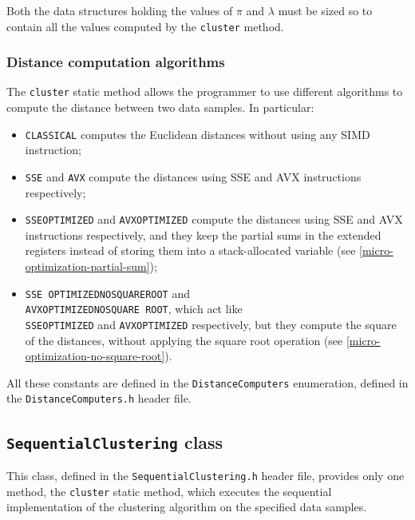 \documentclass{article}
\begin{document}
Both the data structures holding the values of $\pi$ and $\lambda$ must be sized so to contain all the
values computed by the \texttt{cluster} method.

\hypertarget{distance-computation-algorithms}{
\subsubsection{Distance computation algorithms}
\label{distance-computation-algorithms}}

The \texttt{cluster} static method allows the programmer to use different algorithms to compute
the distance between two data samples. In particular:
\begin{itemize}
\item \texttt{CLASSICAL} computes the Euclidean distances without using any SIMD
instruction;
\item \texttt{SSE} and \texttt{AVX} compute the distances using SSE and AVX
instructions respectively;
\item \texttt{SSE\textunderscore OPTIMIZED} and \texttt{AVX\textunderscore OPTIMIZED} compute the distances using
SSE and AVX instructions respectively, and they keep the partial sums in the extended registers
instead of storing them into a stack-allocated variable (see
\ref{micro-optimization-partial-sum});
\item \texttt{SSE\textunderscore
OPTIMIZED\textunderscore NO\textunderscore SQUARE\textunderscore ROOT} and\\
\texttt{AVX\textunderscore OPTIMIZED\textunderscore NO\textunderscore SQUARE\textunderscore
ROOT}, which act like\\ \texttt{SSE\textunderscore OPTIMIZED} and
\texttt{AVX\textunderscore OPTIMIZED} respectively, but they compute the square of the distances,
without applying the square root operation (see \ref{micro-optimization-no-square-root}).
\end{itemize}

All these constants are defined in the \texttt{DistanceComputers} enumeration, defined in the
\texttt{DistanceComputers.h} header file.

\hypertarget{sequential-clustering}{
\subsection{\texttt{SequentialClustering} class}
\label{sequential-clustering}}

This class, defined in the \texttt{SequentialClustering.h} header file, provides only one method,
the \texttt{cluster} static method, which executes the sequential implementation of the
clustering algorithm on the specified data samples.
\end{document}
